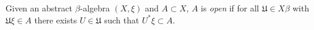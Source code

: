 Given an abstract $\beta$-algebra $(X, \xi)$ and $A \subset X$, $A$ is \textit{open} if for all $\mathfrak{U} \in X\beta$ with $\mathfrak{U}\xi \in A$ there exists $U \in \mathfrak{U}$ such that $U^*\xi \subset A$.
